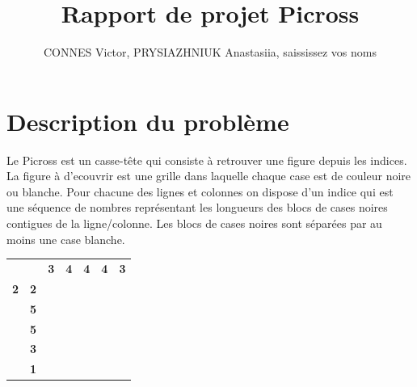 \documentclass{article}
\begin{document}
\title{Rapport de projet Picross}
\author{CONNES Victor, PRYSIAZHNIUK Anastasiia, saississez vos noms}
\maketitle
\tableofcontents 
\newpage
\section{Description du probl\`eme}

Le Picross est un casse-t\^ete qui consiste \`a retrouver une figure depuis les indices. La figure \`a d’ecouvrir est une grille dans laquelle chaque case est de couleur noire ou blanche. Pour chacune des lignes et colonnes on dispose d'un indice qui est une s\'equence de nombres repr\'esentant les longueurs des blocs de cases noires contigues de la ligne/colonne. Les blocs de cases noires sont s\'epar\'ees par au moins une case blanche.

\begin{table}[h]
\centering
\begin{tabular}{ccccccc}
\textbf{}  & \textbf{}                       & \textbf{3}                     & \textbf{4}                     & \textbf{4}                     & \textbf{4}                     & \textbf{3}                     \\ \cline{3-7} 
\textbf{2} & \multicolumn{1}{c|}{\textbf{2}} & \multicolumn{1}{c|}{\textbf{}} & \multicolumn{1}{c|}{\textbf{}} & \multicolumn{1}{c|}{\textbf{}} & \multicolumn{1}{c|}{\textbf{}} & \multicolumn{1}{c|}{\textbf{}} \\ \cline{3-7} 
\textbf{}  & \multicolumn{1}{c|}{\textbf{5}} & \multicolumn{1}{c|}{\textbf{}} & \multicolumn{1}{c|}{\textbf{}} & \multicolumn{1}{c|}{\textbf{}} & \multicolumn{1}{c|}{\textbf{}} & \multicolumn{1}{c|}{\textbf{}} \\ \cline{3-7} 
\textbf{}  & \multicolumn{1}{c|}{\textbf{5}} & \multicolumn{1}{c|}{\textbf{}} & \multicolumn{1}{c|}{\textbf{}} & \multicolumn{1}{c|}{\textbf{}} & \multicolumn{1}{c|}{\textbf{}} & \multicolumn{1}{c|}{\textbf{}} \\ \cline{3-7} 
\textbf{}  & \multicolumn{1}{c|}{\textbf{3}} & \multicolumn{1}{c|}{\textbf{}} & \multicolumn{1}{c|}{\textbf{}} & \multicolumn{1}{c|}{\textbf{}} & \multicolumn{1}{c|}{\textbf{}} & \multicolumn{1}{c|}{\textbf{}} \\ \cline{3-7} 
\textbf{}  & \multicolumn{1}{c|}{\textbf{1}} & \multicolumn{1}{c|}{\textbf{}} & \multicolumn{1}{c|}{\textbf{}} & \multicolumn{1}{c|}{\textbf{}} & \multicolumn{1}{c|}{\textbf{}} & \multicolumn{1}{c|}{\textbf{}} \\ \cline{3-7} 
\end{tabular}
\end{table}
\end{document}
